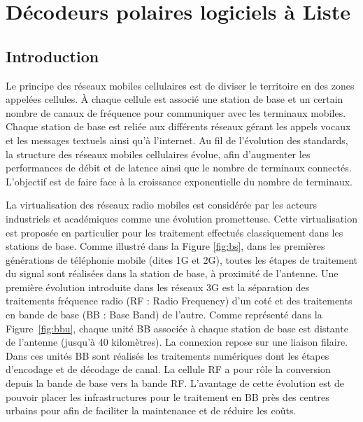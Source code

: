 \chapter{Décodeurs polaires logiciels à Liste} %


\vspace*{\fill}
\minitocTITI
\vspace*{\fill}
\newpage


\section{Introduction}

Le principe des réseaux mobiles cellulaires est de diviser le territoire en des zones appelées cellules. \`A chaque cellule est associé une station de base et un certain nombre de canaux de fréquence pour communiquer avec les terminaux mobiles. Chaque station de base est reliée aux différents réseaux gérant les appels vocaux et les messages textuels ainsi qu'à l'internet. Au fil de l'évolution des standards, la structure des réseaux mobiles cellulaires évolue, afin d'augmenter les performances de débit et de latence ainsi que le nombre de terminaux connectés. L'objectif est de faire face à la croissance exponentielle du nombre de terminaux.

La virtualisation des réseaux radio mobiles est considérée par les acteurs industriels \cite{ericsson_cloud_2015,huawei_5g:_2013} et académiques \cite{wubben_benefits_2014,rost_cloud_2014,checko_cloud_2015} comme une évolution prometteuse. Cette virtualisation est proposée en particulier pour les traitement effectués classiquement dans les stations de base. Comme illustré dans la Figure \ref{fig:bs}, dans les premières générations de téléphonie mobile (dites 1G et 2G), toutes les étapes de traitement du signal sont réalisées dans la station de base, à proximité de l'antenne. Une première évolution introduite dans les réseaux 3G est la séparation des traitements fréquence radio (RF : Radio Frequency) d'un coté et des traitements en bande de base (BB : Base Band) de l'autre. Comme représenté dans la Figure~\ref{fig:bbu}, chaque unité BB associée à chaque station de base est distante de l'antenne (jusqu'à 40 kilomètres). La connexion repose sur une liaison filaire. Dans ces unités BB sont réalisés les traitements numériques dont les étapes d'encodage et de décodage de canal. La cellule RF a pour rôle la conversion depuis la bande de base vers la bande RF. L'avantage de cette évolution est de pouvoir placer les infrastructures pour le traitement en BB près des centres urbains pour afin de faciliter la maintenance et de réduire les coûts.

